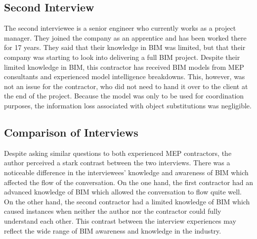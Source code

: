 \subsection{Second Interview}

The second interviewee is a senior engineer who currently works as a project manager.
They joined the company as an apprentice and has been worked there for 17 years.
They said that their knowledge in BIM was limited, but that their company was starting to look into delivering a full BIM project.
Despite their limited knowledge in BIM, this contractor has received BIM models from MEP consultants and experienced model intelligence breakdowns.
This, however, was not an issue for the contractor, who did not need to hand it over to the client at the end of the project.
Because the model was only to be used for coordination purposes, the information loss associated with object substitutions was negligible.


\subsection{Comparison of Interviews}

Despite asking similar questions to both experienced MEP contractors, the author perceived a stark contrast between the two interviews.
There was a noticeable difference in the interviewees' knowledge and awareness of BIM which affected the flow of the conversation.
On the one hand, the first contractor had an advanced knowledge of BIM which allowed the conversation to flow quite well.
On the other hand, the second contractor had a limited knowledge of BIM which caused instances when neither the author nor the contractor could fully understand each other.
This contrast between the interview experiences may reflect the wide range of BIM awareness and knowledge in the industry.

